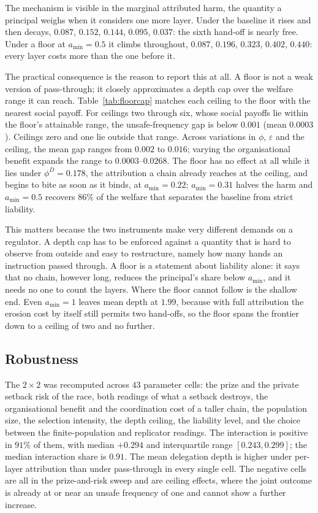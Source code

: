 \documentclass[11pt,a4paper]{article}
\theoremstyle{definition}
\begin{document}
The mechanism is visible in the marginal attributed harm, the quantity a
principal weighs when it considers one more layer. Under the baseline it rises
and then decays, $0.087$, $0.152$, $0.144$, $0.095$, $0.037$: the sixth
hand-off is nearly free. Under a floor at $a_{\min}=0.5$ it climbs throughout,
$0.087$, $0.196$, $0.323$, $0.402$, $0.440$: every layer costs more than the
one before it.

The practical consequence is the reason to report this at all. A floor is not
a weak version of pass-through; it closely approximates a depth cap over the
welfare range it can reach. Table~\ref{tab:floorcap} matches each ceiling to
the floor with the nearest social payoff. For ceilings two through six, whose
social payoffs lie within the floor's attainable range, the unsafe-frequency
gap is below $0.001$ (mean $0.0003$). Ceilings zero and one lie outside that
range. Across variations in $\phi$, $\varepsilon$ and the ceiling, the mean gap
ranges from $0.002$ to $0.016$; varying the organisational benefit expands the
range to $0.0003$--$0.0268$. The floor has no effect at all while it lies under
$\phi^{D}=0.178$, the attribution a chain already reaches at the ceiling, and
begins to bite as soon as it binds, at $a_{\min}=0.22$; $a_{\min}=0.31$ halves
the harm and $a_{\min}=0.5$ recovers $86\%$ of the welfare that separates the
baseline from strict liability.

This matters because the two instruments make very different demands on a
regulator. A depth cap has to be enforced against a quantity that is hard to
observe from outside and easy to restructure, namely how many hands an
instruction passed through. A floor is a statement about liability alone: it
says that no chain, however long, reduces the principal's share below
$a_{\min}$, and it needs no one to count the layers. Where the floor cannot
follow is the shallow end. Even $a_{\min}=1$ leaves mean depth at $1.99$,
because with full attribution the erosion cost by itself still permits two
hand-offs, so the floor spans the frontier down to a ceiling of two and no
further.

\subsection{Robustness}
\label{sec:robustness}

The $2\times2$ was recomputed across $43$ parameter cells: the prize and the
private setback risk of the race, both readings of what a setback destroys, the
organisational benefit and the coordination cost of a taller chain, the
population size, the selection intensity, the depth ceiling, the liability
level, and the choice between the finite-population and replicator readings.
The interaction is positive in $91\%$ of them, with median $+0.294$ and
interquartile range $[0.243,0.299]$; the median interaction share is $0.91$.
The mean delegation depth is higher under per-layer attribution than under
pass-through in every single cell. The negative cells are all in the
prize-and-risk sweep and are ceiling effects, where the joint outcome is already
at or near an unsafe frequency of one and cannot show a further increase.
\end{document}
